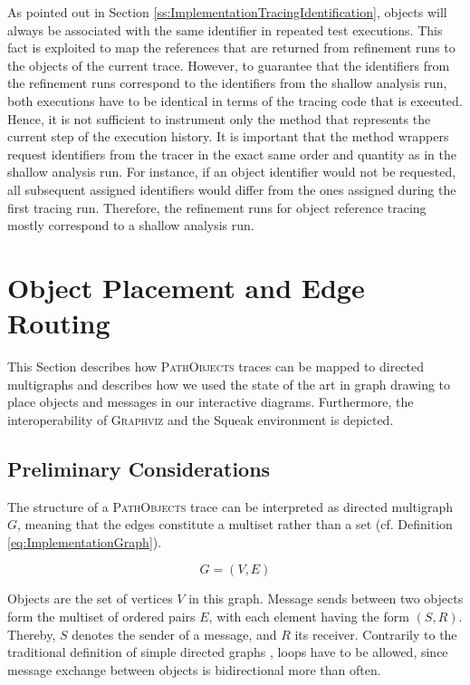 As pointed out in Section \ref{ss:ImplementationTracingIdentification}, objects will always be associated with the same identifier in repeated test executions.
This fact is exploited to map the references that are returned from refinement runs to the objects of the current trace.
However, to guarantee that the identifiers from the refinement runs correspond to the identifiers from the shallow analysis run, both executions have to be identical in terms of the tracing code that is executed.
Hence, it is not sufficient to instrument only the method that represents the current step of the execution history.
It is important that the method wrappers request identifiers from the tracer in the exact same order and quantity as in the shallow analysis run.
For instance, if an object identifier would not be requested, all subsequent assigned identifiers would differ from the ones assigned during the first tracing run.
Therefore, the refinement runs for object reference tracing mostly correspond to a shallow analysis run.

\section[Object Placement and Edge Routing]{Object Placement and Edge Routing%
}
\label{s:ImplementationLayouting}

This Section describes how \textsc{PathObjects} traces can be mapped to directed multigraphs and describes how we used the state of the art in graph drawing to place objects and messages in our interactive diagrams.
Furthermore, the interoperability of \textsc{Graphviz} and the Squeak environment is depicted.

\subsection{Preliminary Considerations}
The structure of a \textsc{PathObjects} trace can be interpreted as directed multigraph $G$, meaning that the edges constitute a multiset rather than a set (cf. Definition \ref{eq:ImplementationGraph}).

\begin{equation}
G = (V, E)
\label{eq:ImplementationGraph}
\end{equation}

Objects are the set of vertices $V$ in this graph.
Message sends between two objects form the multiset of ordered pairs $E$, with each element having the form $(S,R)$.
Thereby, $S$ denotes the sender of a message, and $R$ its receiver.
Contrarily to the traditional definition of simple directed graphs \cite{berge_graphs_1985}, loops have to be allowed, since message exchange between objects is bidirectional more than often.

